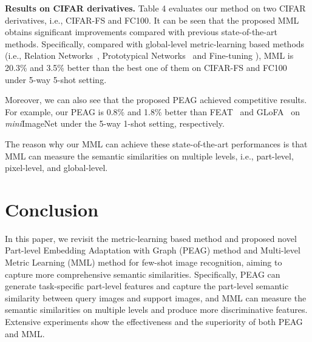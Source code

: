 \documentclass{article}
\begin{document}
\textbf{Results on CIFAR derivatives.}
Table 4 evaluates our method on two CIFAR derivatives, i.e., CIFAR-FS and FC100. It can be seen that the proposed MML obtains significant improvements compared with previous state-of-the-art methods. Specifically, compared with global-level metric-learning based methods (i.e., Relation Networks~\cite{sung2018learning}, Prototypical Networks~\cite{snell2017prototypical} and Fine-tuning \cite{dhillon2019baseline}), MML is 20.3\% and 3.5\% better than the best one of them on CIFAR-FS and FC100 under 5-way 5-shot setting.

Moreover, we can also see that the proposed PEAG achieved competitive results. For example, our PEAG is 0.8\% and 1.8\% better than FEAT~\cite{feat} and GLoFA~\cite{glofa} on \emph{mini}ImageNet under the 5-way 1-shot setting, respectively.

The reason why our MML can achieve these state-of-the-art performances is that MML can measure the semantic similarities on multiple levels, i.e., part-level, pixel-level, and global-level.

\section{Conclusion}
In this paper, we revisit the metric-learning based method and proposed novel Part-level Embedding Adaptation with Graph (PEAG) method and Multi-level Metric Learning (MML) method for few-shot image recognition, aiming to capture more comprehensive semantic similarities. Specifically, PEAG can generate task-specific part-level features and capture the part-level semantic similarity between query images and support images, and MML can measure the semantic similarities on multiple levels and produce more discriminative features. Extensive experiments show the effectiveness and the superiority of both PEAG and MML.



\end{document}

